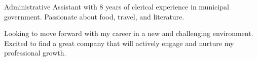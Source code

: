 

\begin{cvparagraph}

Administrative Assistant with 8 years of clerical experience in municipal government.
Passionate about food, travel, and literature.

Looking to move forward with my career in a new and challenging environment.
Excited to find a great company that will actively engage and nurture my professional growth.
\end{cvparagraph}
